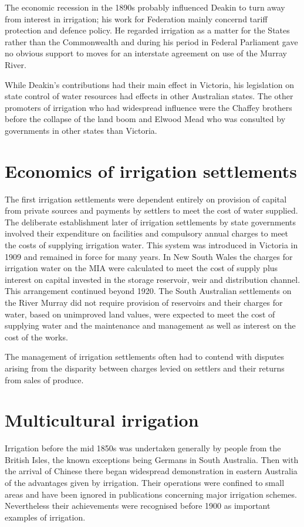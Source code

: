 The economic recession in the 1890s probably influenced Deakin to turn
away from interest in irrigation; his work for Federation mainly
concernd tariff protection and defence policy.  He regarded irrigation
as a matter for the States rather than the Commonwealth and during his
period in Federal Parliament gave no obvious support to moves for an
interstate agreement on use of the Murray River.

While Deakin's contributions had their main effect in Victoria, his
legislation on state control of water resources had effects in other
Australian states.  The other promoters of irrigation who had
widespread influence were the Chaffey brothers before the collapse of
the land boom and Elwood Mead who was consulted by governments in
other states than Victoria.

\section*{Economics of irrigation settlements}

The first irrigation settlements were dependent entirely on provision
of capital from private sources and payments by settlers to meet the
cost of water supplied.  The deliberate establishment later of
irrigation settlements by state governments involved their expenditure
on facilities and compulsory annual charges to meet the costs of
supplying irrigation water.  This system was introduced in Victoria in
1909 and remained in force for many years.  In New South Wales the
charges for irrigation water on the MIA were calculated to meet the
cost of supply plus interest on capital invested in the storage
reservoir, weir and distribution channel.  This arrangement continued
beyond 1920.  The South Australian settlements on the River Murray did
not require provision of reservoirs and their charges for water, based
on unimproved land values, were expected to meet the cost of supplying
water and the maintenance and management as well as interest on the
cost of the works.

The management of irrigation settlements often had to contend with
disputes arising from the disparity between charges levied on settlers
and their returns from sales of produce.

\section*{Multicultural irrigation}

Irrigation before the mid 1850s was undertaken generally by people
from the British Isles, the known exceptions being Germans in South
Australia.  Then with the arrival of Chinese there began widespread
demonstration in eastern Australia of the advantages given by
irrigation.  Their operations were confined to small areas and have
been ignored in publications concerning major irrigation schemes.
Nevertheless their achievements were recognised before 1900 as
important examples of irrigation.

